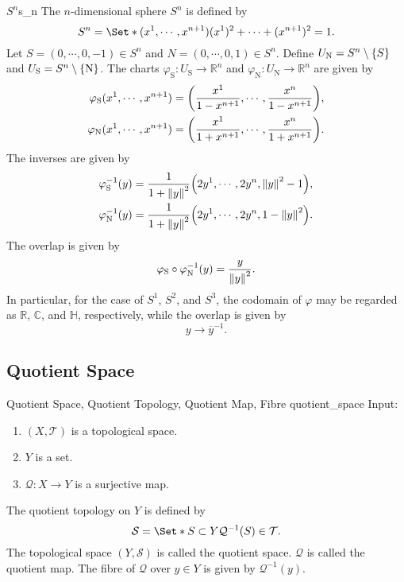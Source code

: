 \documentclass{article}
\begin{document}
\begin{example}{$S^n$}{s_n}
    The $n$-dimensional sphere $S^n$ is defined by
    \[ S^n = \Set*{(x^1,\cdots,x^{n+1})}{(x^1)^2 + \cdots + (x^{n+1})^2 = 1}. \]
    Let $S = (0,\cdots,0,-1) \in S^n$ and $N = (0,\cdots,0,1) \in S^n$.
    Define $U_{\mathrm{N}} = S^n \setminus \qty{S}$ and $U_{\mathrm{S}} = S^n \setminus \qty{\mathrm{N}}$.
    The charts $\varphi_{\mathrm{S}}: U_{\mathrm{S}} \rightarrow \mathbb{R}^n$ and $\varphi_{\mathrm{N}}: U_{\mathrm{N}}\rightarrow \mathbb{R}^n$ are given by
    \begin{align*}
        \varphi_{\mathrm{S}}(x^1,\cdots,x^{n+1}) &= \qty(\frac{x^1}{1-x^{n+1}},\cdots, \frac{x^n}{1-x^{n+1}}), \\
        \varphi_{\mathrm{N}}(x^1,\cdots,x^{n+1}) &= \qty(\frac{x^1}{1+x^{n+1}},\cdots, \frac{x^n}{1+x^{n+1}}).
    \end{align*}
    The inverses are given by
    \begin{align*}
        \varphi^{-1}_{\mathrm{S}}(y) &= \frac{1}{1+\norm{y}^2}\qty(2y^1,\cdots,2y^n,\norm{y}^2 - 1), \\
        \varphi^{-1}_{\mathrm{N}}(y) &= \frac{1}{1+\norm{y}^2}\qty(2y^1,\cdots,2y^n,1-\norm{y}^2).
    \end{align*}
    The overlap is given by
    \[ \varphi_{\mathrm{S}}\circ \varphi^{-1}_{\mathrm{N}}(y) = \frac{y}{\norm{y}^2}. \]
    In particular, for the case of $S^1$, $S^2$, and $S^3$, the codomain of $\varphi$ may be regarded as $\mathbb{R}$, $\mathbb{C}$, and $\mathbb{H}$, respectively, while the overlap is given by
    \[ y\rightarrow \overline{y}^{-1}. \]
\end{example}

\subsection{Quotient Space}

\begin{definition}{Quotient Space, Quotient Topology, Quotient Map, Fibre }{quotient_space}
    Input:
    \begin{enumerate}
        \item $(X,\mathcal{T})$ is a topological space.
        \item $Y$ is a set.
        \item $\mathcal{Q}:X\rightarrow Y$ is a surjective map.
    \end{enumerate}
    The quotient topology on $Y$ is defined by
    \[ \mathcal{S} = \Set*{S\subset Y}{\mathcal{Q}^{-1}(S) \in \mathcal{T}}. \]
    The topological space $(Y,\mathcal{S})$ is called the quotient space.
    $\mathcal{Q}$ is called the quotient map. The fibre of $\mathcal{Q}$ over $y\in Y$ is given by $\mathcal{Q}^{-1}(y)$.
\end{definition}
\end{document}
